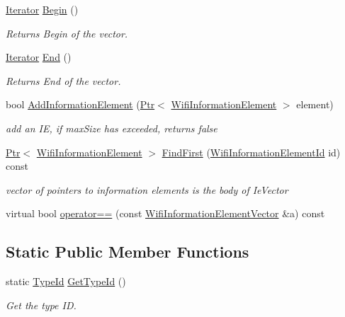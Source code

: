 \begin{DoxyCompactItemize}
\hyperlink{classns3_1_1WifiInformationElementVector_a19429192ca24ca8c4c51fe1f998e0a2f}{Iterator} \hyperlink{classns3_1_1WifiInformationElementVector_a9130ccc65a2673aeea0a0b9c9c2bf6d2}{Begin} ()
\begin{DoxyCompactList}\small\item\em Returns Begin of the vector. \end{DoxyCompactList}\item 
\hyperlink{classns3_1_1WifiInformationElementVector_a19429192ca24ca8c4c51fe1f998e0a2f}{Iterator} \hyperlink{classns3_1_1WifiInformationElementVector_a7fe2928458752e2d29a6508f4a254986}{End} ()
\begin{DoxyCompactList}\small\item\em Returns End of the vector. \end{DoxyCompactList}\item 
bool \hyperlink{classns3_1_1WifiInformationElementVector_aa28c3ec3babb8fd9622c424b5e0beb3f}{Add\+Information\+Element} (\hyperlink{classns3_1_1Ptr}{Ptr}$<$ \hyperlink{classns3_1_1WifiInformationElement}{Wifi\+Information\+Element} $>$ element)
\begin{DoxyCompactList}\small\item\em add an IE, if max\+Size has exceeded, returns false \end{DoxyCompactList}\item 
\hyperlink{classns3_1_1Ptr}{Ptr}$<$ \hyperlink{classns3_1_1WifiInformationElement}{Wifi\+Information\+Element} $>$ \hyperlink{classns3_1_1WifiInformationElementVector_a63263edec5a512fa9f15a5055d66d0f1}{Find\+First} (\hyperlink{namespacens3_aeb185e0c8a60816016bca079f1420478}{Wifi\+Information\+Element\+Id} id) const 
\begin{DoxyCompactList}\small\item\em vector of pointers to information elements is the body of Ie\+Vector \end{DoxyCompactList}\item 
virtual bool \hyperlink{classns3_1_1WifiInformationElementVector_aab48e40d0acd66fef17067360c0faf99}{operator==} (const \hyperlink{classns3_1_1WifiInformationElementVector}{Wifi\+Information\+Element\+Vector} \&a) const 
\end{DoxyCompactItemize}
\subsection*{Static Public Member Functions}
\begin{DoxyCompactItemize}
\item 
static \hyperlink{classns3_1_1TypeId}{Type\+Id} \hyperlink{classns3_1_1WifiInformationElementVector_a8d1fe435dbee487d00e0e1186fda77a6}{Get\+Type\+Id} ()
\begin{DoxyCompactList}\small\item\em Get the type ID. \end{DoxyCompactList}\end{DoxyCompactItemize}
